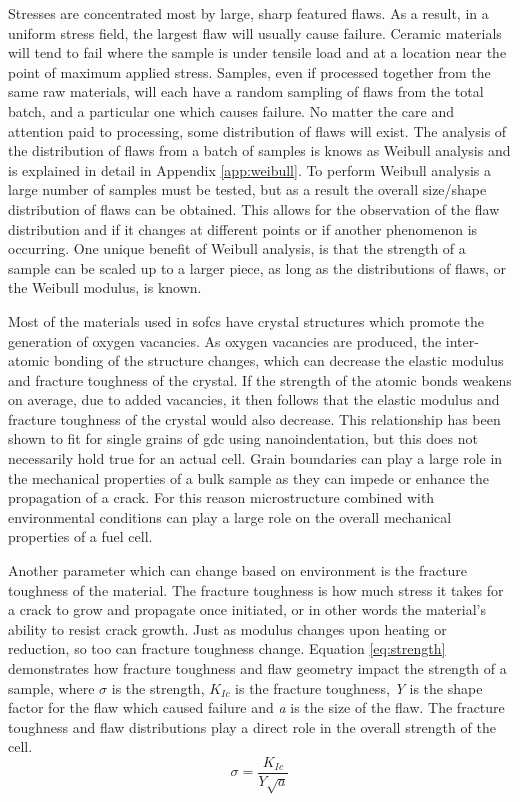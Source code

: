     Stresses are concentrated most by large, sharp featured flaws.
    As a result, in a uniform stress field, the largest flaw will usually cause failure.
    Ceramic materials will tend to fail where the sample is under tensile load and at a location near the point of maximum applied stress.
    Samples, even if processed together from the same raw materials, will each have a random sampling of flaws from the total batch, and a particular one which causes failure.
    No matter the care and attention paid to processing, some distribution of flaws will exist.
    The analysis of the distribution of flaws from a batch of samples is knows as Weibull analysis and is explained in detail in Appendix \ref{app:weibull}.
    To perform Weibull analysis a large number of samples must be tested, but as a result the overall size/shape distribution of flaws can be obtained.
    This allows for the observation of the flaw distribution and if it changes at different points or if another phenomenon is occurring.
    One unique benefit of Weibull analysis, is that the strength of a sample can be scaled up to a larger piece, as long as the distributions of flaws, or the Weibull modulus, is known.

    Most of the materials used in \glspl{sofc} have crystal structures which promote the generation of oxygen vacancies.
    As oxygen vacancies are produced, the inter-atomic bonding of the structure changes, which can decrease the elastic modulus and fracture toughness of the crystal.\cite{Bishop2014,Duncan2006}
    If the strength of the atomic bonds weakens on average, due to added vacancies, it then follows that the elastic modulus and fracture toughness of the crystal would also decrease.
    This relationship has been shown to fit for single grains of \gls{gdc} using nanoindentation, but this does not necessarily hold true for an actual cell.\cite{Wang2007}
    Grain boundaries can play a large role in the mechanical properties of a bulk sample as they can impede or enhance the propagation of a crack.
    For this reason microstructure combined with environmental conditions can play a large role on the overall mechanical properties of a fuel cell.

    Another parameter which can change based on environment is the fracture toughness of the material.
    The fracture toughness is how much stress it takes for a crack to grow and propagate once initiated, or in other words the material's ability to resist crack growth.
    Just as modulus changes upon heating or reduction, so too can fracture toughness change.
    Equation \ref{eq:strength} demonstrates how fracture toughness and flaw geometry impact the strength of a sample, where $\sigma$ is the strength, $K_{Ic}$ is the fracture toughness, \textit{Y} is the shape factor for the flaw which caused failure and \textit{a} is the size of the flaw.\cite{Green1998}
    The fracture toughness and flaw distributions play a direct role in the overall strength of the cell.
    \begin{equation}
        \sigma = \frac{K_{Ic}}{Y\sqrt{a}}
        \label{eq:strength}
    \end{equation}

